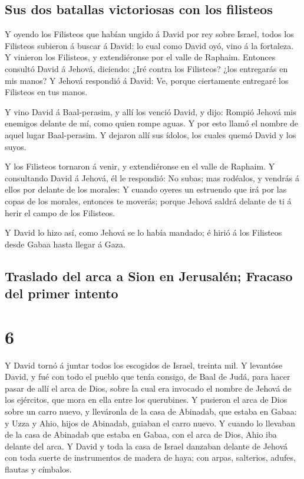 \hypertarget{sus-dos-batallas-victoriosas-con-los-filisteos}{%
\subsection{Sus dos batallas victoriosas con los
filisteos}\label{sus-dos-batallas-victoriosas-con-los-filisteos}}

 Y oyendo los Filisteos que habían ungido á David por rey
sobre Israel, todos los Filisteos subieron á buscar á David: lo cual
como David oyó, vino á la fortaleza.  Y vinieron los
Filisteos, y extendiéronse por el valle de Raphaim. 
Entonces consultó David á Jehová, diciendo: ¿Iré contra los Filisteos?
¿los entregarás en mis manos? Y Jehová respondió á David: Ve, porque
ciertamente entregaré los Filisteos en tus manos.

 Y vino David á Baal-perasim, y allí los venció David, y
dijo: Rompió Jehová mis enemigos delante de mí, como quien rompe aguas.
Y por esto llamó el nombre de aquel lugar Baal-perasim. 
Y dejaron allí sus ídolos, los cuales quemó David y los suyos.

 Y los Filisteos tornaron á venir, y extendiéronse en el
valle de Raphaim.  Y consultando David á Jehová, él le
respondió: No subas; mas rodéalos, y vendrás á ellos por delante de los
morales:  Y cuando oyeres un estruendo que irá por las
copas de los morales, entonces te moverás; porque Jehová saldrá delante
de ti á herir el campo de los Filisteos.

 Y David lo hizo así, como Jehová se lo había mandado; é
hirió á los Filisteos desde Gabaa hasta llegar á Gaza.

\hypertarget{traslado-del-arca-a-sion-en-jerusaluxe9n-fracaso-del-primer-intento}{%
\subsection{Traslado del arca a Sion en Jerusalén; Fracaso del primer
intento}\label{traslado-del-arca-a-sion-en-jerusaluxe9n-fracaso-del-primer-intento}}

\hypertarget{section-5}{%
\section{6}\label{section-5}}

 Y David tornó á juntar todos los escogidos de Israel,
treinta mil.  Y levantóse David, y fué con todo el pueblo
que tenía consigo, de Baal de Judá, para hacer pasar de allí el arca de
Dios, sobre la cual era invocado el nombre de Jehová de los ejércitos,
que mora en ella entre los querubines.  Y pusieron el arca
de Dios sobre un carro nuevo, y lleváronla de la casa de Abinadab, que
estaba en Gabaa: y Uzza y Ahio, hijos de Abinadab, guiaban el carro
nuevo.  Y cuando lo llevaban de la casa de Abinadab que
estaba en Gabaa, con el arca de Dios, Ahio iba delante del arca.
 Y David y toda la casa de Israel danzaban delante de
Jehová con toda suerte de instrumentos de madera de haya; con arpas,
salterios, adufes, flautas y címbalos.

